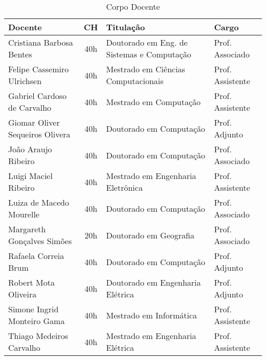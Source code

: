 \begin{table}
	\centering
	\caption{Corpo Docente}
	\label{CorpoDocente}
	\begin{tabular}{|l|c|l|l|}
		\hline
		{\textbf{Docente}}                   & \textbf{CH} & \textbf{Titulação}                         & \textbf{Cargo}  \\
		\hline
		Cristiana Barbosa Bentes             & 40h         & Doutorado em Eng. de Sistemas e Computação & Prof. Associado \\
		Felipe Cassemiro Ulrichsen	         & 40h         & Mestrado em Ciências Computacionais      	& Prof. Assistente\\
		Gabriel Cardoso de Carvalho          & 40h         & Mestrado em Computação                     & Prof. Assistente\\
		Giomar Oliver Sequeiros Olivera      & 40h         & Doutorado em Computação                    & Prof. Adjunto   \\
		João Araujo Ribeiro                  & 40h         & Doutorado em Computação                    & Prof. Associado \\
		Luigi Maciel Ribeiro 	             & 40h         & Mestrado em Engenharia Eletrônica          & Prof. Assistente \\
		Luiza de Macedo Mourelle             & 40h         & Doutorado em Computação                    & Prof. Associado \\
		Margareth Gonçalves Simões           & 20h         & Doutorado em Geografia                     & Prof. Associado \\
		Rafaela Correia Brum		         & 40h         & Doutorado em Computação                    & Prof. Adjunto   \\	
		Robert Mota Oliveira		         & 40h         & Doutorado em Engenharia Elétrica           & Prof. Adjunto   \\	
		Simone Ingrid Monteiro Gama		     & 40h         & Mestrado em Informática             		& Prof. Assistente\\	
		Thiago Medeiros Carvalho		     & 40h         & Mestrado em Engenharia Elétrica            & Prof. Assistente\\	

\end{tabular}
\end{table}
